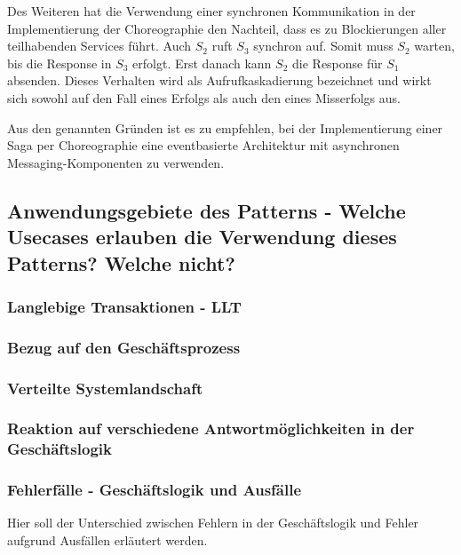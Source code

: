 Des Weiteren hat die Verwendung einer synchronen Kommunikation in der Implementierung der Choreographie den Nachteil, dass es zu Blockierungen aller teilhabenden Services führt. Auch $S_2$ ruft $S_3$ synchron auf. Somit muss $S_2$ warten, bis die Response in $S_3$ erfolgt. Erst danach kann $S_2$ die Response für $S_1$ absenden. Dieses Verhalten wird als Aufrufkaskadierung bezeichnet und wirkt sich sowohl auf den Fall eines Erfolgs als auch den eines Misserfolgs aus. 

Aus den genannten Gründen ist es zu empfehlen, bei der Implementierung einer Saga per Choreographie eine eventbasierte Architektur mit asynchronen Messaging-Komponenten zu verwenden.

\subsection{Anwendungsgebiete des Patterns - Welche Usecases erlauben die Verwendung dieses Patterns? Welche nicht?}

\subsubsection{Langlebige Transaktionen - LLT}
\subsubsection{Bezug auf den Geschäftsprozess}
\subsubsection{Verteilte Systemlandschaft}
\subsubsection{Reaktion auf verschiedene Antwortmöglichkeiten in der Geschäftslogik}
\subsubsection{Fehlerfälle - Geschäftslogik und Ausfälle}
Hier soll der Unterschied zwischen Fehlern in der Geschäftslogik und Fehler aufgrund Ausfällen erläutert werden.

